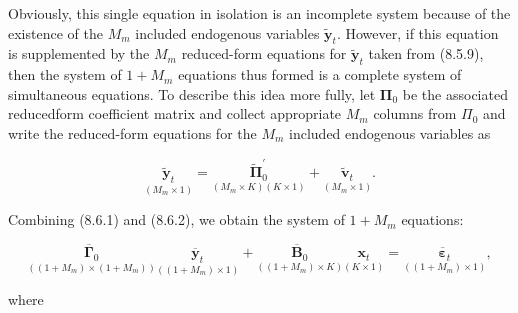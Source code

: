 \documentclass[10pt]{article}
\begin{document}
Obviously, this single equation in isolation is an incomplete system because of the existence of the $M_{m}$ included endogenous variables $\tilde{\mathbf{y}}_{t}$. However, if this equation is supplemented by the $M_{m}$ reduced-form equations for $\tilde{\mathbf{y}}_{t}$ taken from (8.5.9), then the system of $1+M_{m}$ equations thus formed is a complete system of simultaneous equations. To describe this idea more fully, let $\boldsymbol{\Pi}_{0}$ be the associated reducedform coefficient matrix and collect appropriate $M_{m}$ columns from $\Pi_{0}$ and write the reduced-form equations for the $M_{m}$ included endogenous variables as


\begin{equation*}
\underset{\left(M_{m} \times 1\right)}{\tilde{\mathbf{y}}_{t}}=\underset{\left(M_{m} \times K\right)(K \times 1)}{\tilde{\boldsymbol{\Pi}}_{0}^{\prime}}+\underset{\left(M_{m} \times 1\right)}{\tilde{\mathbf{v}}_{t}} . \tag{8.6.2}
\end{equation*}


Combining (8.6.1) and (8.6.2), we obtain the system of $1+M_{m}$ equations:


\begin{equation*}
\underset{\left(\left(1+M_{m}\right) \times\left(1+M_{m}\right)\right)}{\overline{\mathbf{\Gamma}}_{0}} \underset{\left(\left(1+M_{m}\right) \times 1\right)}{\overline{\mathbf{y}}_{t}}+\underset{\left(\left(1+M_{m}\right) \times K\right)}{\overline{\mathbf{B}}_{0}} \underset{(K \times 1)}{\mathbf{x}_{t}}=\underset{\left(\left(1+M_{m}\right) \times 1\right)}{\overline{\boldsymbol{\varepsilon}}_{t}}, \tag{8.6.3}
\end{equation*}


where
\end{document}
